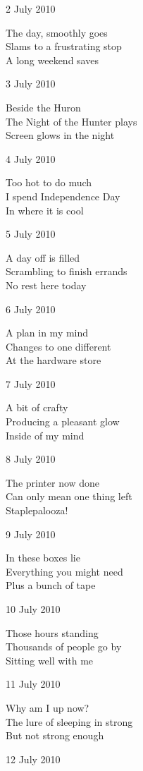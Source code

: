\documentclass[12pt]{article}
\begin{document}
2 July 2010

The day, smoothly goes \\
Slams to a frustrating stop \\
A long weekend saves

3 July 2010

Beside the Huron \\
The Night of the Hunter plays \\
Screen glows in the night

\newpage

4 July 2010

Too hot to do much \\
I spend Independence Day \\
In where it is cool

5 July 2010

A day off is filled \\
Scrambling to finish errands \\
No rest here today

6 July 2010

A plan in my mind \\
Changes to one different \\
At the hardware store

7 July 2010

A bit of crafty \\
Producing a pleasant glow \\
Inside of my mind

8 July 2010

The printer now done \\
Can only mean one thing left \\
Staplepalooza!

9 July 2010

In these boxes lie \\
Everything you might need \\
Plus a bunch of tape

10 July 2010

Those hours standing \\
Thousands of people go by \\
Sitting well with me

\newpage

11 July 2010

Why am I up now? \\
The lure of sleeping in strong \\
But not strong enough

12 July 2010
\end{document}
